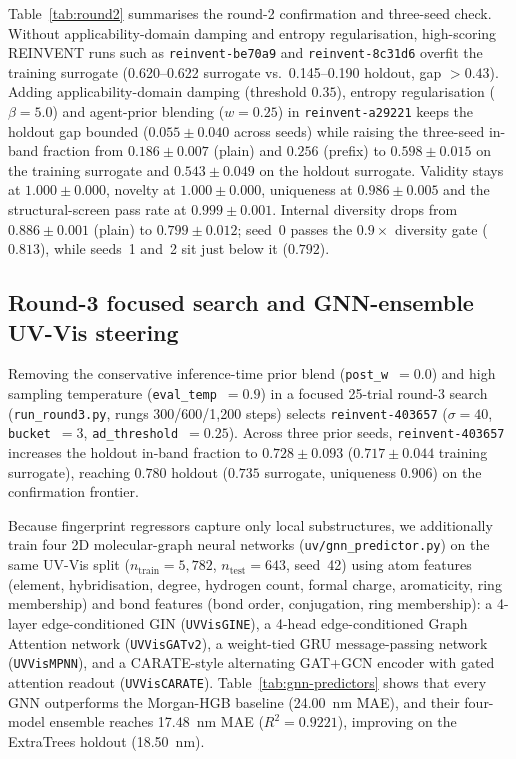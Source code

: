\documentclass[11pt]{article}
\begin{document}
Table~\ref{tab:round2} summarises the round-2 confirmation and three-seed check. Without
applicability-domain damping and entropy regularisation, high-scoring REINVENT runs such as
\texttt{reinvent-be70a9} and \texttt{reinvent-8c31d6} overfit the training surrogate (0.620--0.622
surrogate vs.\ 0.145--0.190 holdout, gap $>0.43$). Adding applicability-domain damping (threshold $0.35$), entropy regularisation ($\beta=5.0$)
and agent-prior blending ($w=0.25$) in \texttt{reinvent-a29221} keeps the holdout
gap bounded ($0.055 \pm 0.040$ across seeds) while raising the three-seed in-band fraction
from $0.186 \pm 0.007$ (plain) and $0.256$ (prefix) to $0.598 \pm 0.015$ on the training
surrogate and $0.543 \pm 0.049$ on the holdout surrogate. Validity stays at $1.000 \pm 0.000$,
novelty at $1.000 \pm 0.000$, uniqueness at $0.986 \pm 0.005$ and the structural-screen pass
rate at $0.999 \pm 0.001$. Internal diversity drops from $0.886 \pm 0.001$ (plain) to
$0.799 \pm 0.012$; seed~0 passes the $0.9\times$ diversity gate ($0.813$), while seeds~1 and~2
sit just below it ($0.792$).

\subsection{Round-3 focused search and GNN-ensemble UV-Vis steering}
\label{sec:round3-gnn}

Removing the conservative inference-time prior blend (\texttt{post\_w}~$=0.0$) and high
sampling temperature (\texttt{eval\_temp}~$=0.9$) in a focused 25-trial round-3 search
(\texttt{run\_round3.py}, rungs 300/600/1{,}200 steps) selects \texttt{reinvent-403657}
($\sigma=40$, \texttt{bucket}~$=3$, \texttt{ad\_threshold}~$=0.25$). Across three prior seeds,
\texttt{reinvent-403657} increases the holdout in-band fraction to $0.728 \pm 0.093$
($0.717 \pm 0.044$ training surrogate), reaching $0.780$ holdout ($0.735$ surrogate,
uniqueness $0.906$) on the confirmation frontier.

Because fingerprint regressors capture only local substructures, we additionally train four
2D molecular-graph neural networks (\texttt{uv/gnn\_predictor.py}) on the same UV-Vis split
($n_{\mathrm{train}}=5{,}782$, $n_{\mathrm{test}}=643$, seed~42) using atom features
(element, hybridisation, degree, hydrogen count, formal charge, aromaticity, ring membership)
and bond features (bond order, conjugation, ring membership): a 4-layer edge-conditioned GIN
(\texttt{UVVisGINE}), a 4-head edge-conditioned Graph Attention network (\texttt{UVVisGATv2}),
a weight-tied GRU message-passing network (\texttt{UVVisMPNN}), and a CARATE-style alternating
GAT+GCN encoder with gated attention readout (\texttt{UVVisCARATE}). Table~\ref{tab:gnn-predictors}
shows that every GNN outperforms the Morgan-HGB baseline (24.00~nm MAE), and their four-model
ensemble reaches 17.48~nm MAE ($R^2=0.9221$), improving on the ExtraTrees holdout (18.50~nm).
\end{document}
